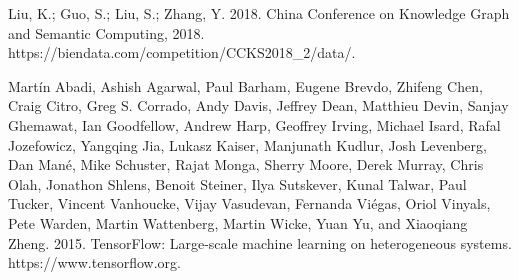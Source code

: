 \documentclass[letterpaper]{article} %
\begin{document}
\smallskip \noindent
Liu, K.; Guo, S.; Liu, S.; Zhang, Y. 2018. China Conference on Knowledge Graph and Semantic Computing, 2018. https://biendata.com/competition/CCKS2018\_2/data/. 

\smallskip \noindent
Martín Abadi, Ashish Agarwal, Paul Barham, Eugene Brevdo, Zhifeng Chen, Craig Citro, Greg S. Corrado, Andy Davis, Jeffrey Dean, Matthieu Devin, Sanjay Ghemawat, Ian Goodfellow, Andrew Harp, Geoffrey Irving, Michael Isard, Rafal Jozefowicz, Yangqing Jia, Lukasz Kaiser, Manjunath Kudlur, Josh Levenberg, Dan Mané, Mike Schuster, Rajat Monga, Sherry Moore, Derek Murray, Chris Olah, Jonathon Shlens, Benoit Steiner, Ilya Sutskever, Kunal Talwar, Paul Tucker, Vincent Vanhoucke, Vijay Vasudevan, Fernanda Viégas, Oriol Vinyals, Pete Warden, Martin Wattenberg, Martin Wicke, Yuan Yu, and Xiaoqiang Zheng. 2015. TensorFlow: Large-scale machine learning on heterogeneous systems. https://www.tensorflow.org.
\end{document}
